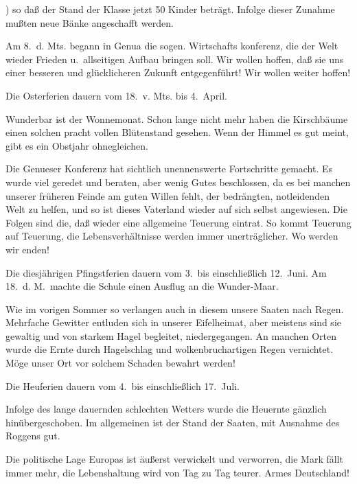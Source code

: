 

)\ob
so daß der Stand der Klasse jetzt 50 Kinder beträgt.\ob
Infolge dieser Zunahme mußten neue Bänke angeschafft\ob
werden.

%
Am 8.\ d. Mts. begann in Genua die sogen. Wirtschafts\ohb
konferenz, die der Welt wieder Frieden u.\ allseitigen\ob
Aufbau bringen soll. Wir wollen hoffen, daß sie\ob
uns einer besseren und glücklicheren Zukunft entgegenführt!\ob
Wir wollen weiter hoffen!

%
Die Osterferien dauern vom 18.\ v. Mts. bis 4.\ April.

%
Wunderbar ist der Wonnemonat. Schon lange\ob
nicht mehr haben die Kirschbäume einen solchen pracht\ohb
vollen Blütenstand gesehen. Wenn der Himmel\ob
es gut meint, gibt es ein Obstjahr ohnegleichen.

Die Genueser Konferenz hat sichtlich\ob
unennenswerte Fortschritte gemacht. Es wurde\ob
viel geredet und beraten, aber wenig Gutes beschlossen,\ob
da es bei manchen unserer früheren Feinde am\ob
guten Willen fehlt, der bedrängten, notleidenden\ob
Welt zu helfen, und so ist dieses Vaterland wieder auf\ob
sich selbst angewiesen. Die Folgen sind die, daß wieder\ob
eine allgemeine Teuerung eintrat. So kommt\ob
Teuerung auf Teuerung, die Lebensverhältnisse\ob
werden immer unerträglicher. Wo werden wir\ob
enden!

%
Die diesjährigen Pfingstferien dauern vom 3.\ bis\ob
einschließlich 12.\ Juni. Am 18.\ d. M.\ machte die Schule\ob
einen Ausflug an die Wunder-Maar.

%
Wie im vorigen Sommer so verlangen auch\ob
in diesem unsere Saaten nach Regen. Mehrfache\ob
Gewitter entluden sich in unserer Eifelheimat, aber\ob
meistens sind sie gewaltig und von starkem Hagel\ob
begleitet, niedergegangen. An manchen Orten wurde\ob
die Ernte durch Hagelschlag und wolkenbruchartigen\ob
Regen vernichtet. Möge unser Ort vor solchem\ob
Schaden bewahrt werden!

%
Die Heuferien dauern vom 4.\ bis einschließlich 17.\ Juli.

%
Infolge des lange dauernden schlechten Wetters wurde\ob
die Heuernte gänzlich hinübergeschoben. Im allgemeinen\ob
ist der Stand der Saaten, mit Ausnahme des Roggens gut.

Die politische Lage Europas ist äußerst verwickelt\ob
und verworren, die Mark fällt immer mehr, die\ob
Lebenshaltung wird von Tag zu Tag teurer.\ob
Armes Deutschland!
\pend

